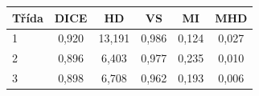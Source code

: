 \begin{tabular}{l c c c c c}
 \hline
Třída & DICE & HD & VS & MI & MHD \\ \hline
1 & 0,920 & 13,191 & 0,986 & 0,124 & 0,027 \\
2 & 0,896 & 6,403 & 0,977 & 0,235 & 0,010 \\
3 & 0,898 & 6,708 & 0,962 & 0,193 & 0,006 \\
\hline 
 \end{tabular}
